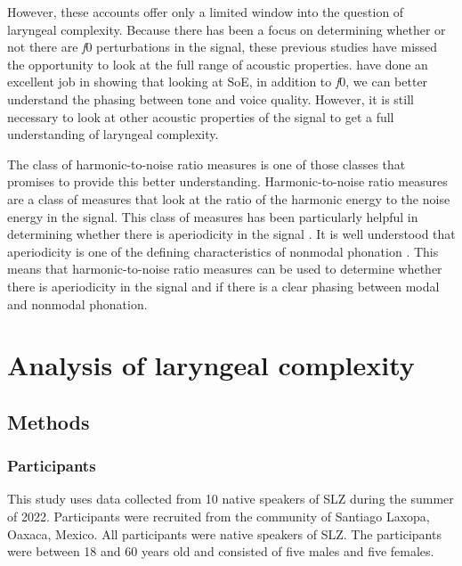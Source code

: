 However, these accounts offer only a limited window into the question of laryngeal complexity. Because there has been a focus on determining whether or not there are \textit{f}0 perturbations in the signal, these previous studies have missed the opportunity to look at the full range of acoustic properties. \citet{wellerInteractionsToneGlottalization2023,wellerLexicalToneVowel2023,wellerVoiceQualityTone2024} have done an excellent job in showing that looking at SoE, in addition to \textit{f}0, we can better understand the phasing between tone and voice quality. However, it is still necessary to look at other acoustic properties of the signal to get a full understanding of laryngeal complexity. 

The class of harmonic-to-noise ratio measures is one of those classes that promises to provide this better understanding. Harmonic-to-noise ratio measures are a class of measures that look at the ratio of the harmonic energy to the noise energy in the signal. This class of measures has been particularly helpful in determining whether there is aperiodicity in the signal \citep{dekromCepstrumBasedTechniqueDetermining1993,ferrerriesgoWhatMakesCepstral2020,garellekPhoneticsVoice2019}. It is well understood that aperiodicity is one of the defining characteristics of nonmodal phonation \citep{ladefogedSoundsWorldsLanguages1996}. This means that harmonic-to-noise ratio measures can be used to determine whether there is aperiodicity in the signal and if there is a clear phasing between modal and nonmodal phonation.



\section{Analysis of laryngeal complexity}\label{sec:analysis_of_lc}
\subsection{Methods} \label{sec:methods}
\subsubsection{Participants} \label{sec:participants}
This study uses data collected from 10 native speakers of SLZ during the summer of 2022. Participants were recruited from the community of Santiago Laxopa, Oaxaca, Mexico. All participants were native speakers of SLZ. The participants were between 18 and 60 years old and consisted of five males and five females.

